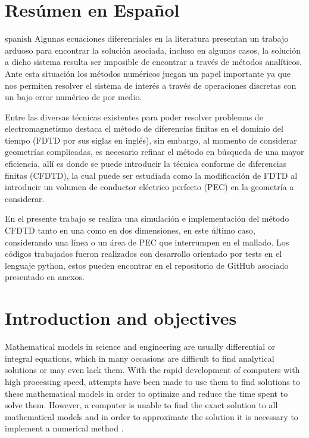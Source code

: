 \documentclass[12pt, oneside]{book}
\begin{document}
\chapter*{Resúmen en Español}

\begin{otherlanguage*}{spanish}
    \indent Algunas ecuaciones diferenciales en la literatura presentan un trabajo arduoso para encontrar la solución asociada, incluso en algunos casos, la solución a dicho sistema resulta ser imposible de encontrar a través de métodos analíticos. Ante esta situación los métodos numéricos juegan un papel importante ya que nos permiten resolver el sistema de interés a través de operaciones discretas con un bajo error numérico de por medio. 

    \indent Entre las diversas técnicas existentes para poder resolver problemas de electromagnetismo destaca el método de diferencias finitas en el dominio del tiempo (FDTD por sus siglas en inglés), sin embargo, al momento de considerar geometrías complicadas, es necesario refinar el método en búsqueda de una mayor eficiencia, allí es donde se puede introducir la técnica conforme de diferencias finitas (CFDTD), la cual puede ser estudiada como la modificación de FDTD al introducir un volumen de conductor eléctrico perfecto (PEC) en la geometría a considerar.

    \indent En el presente trabajo se realiza una simulación e implementación del método CFDTD tanto en una como en dos dimensiones, en este último caso, considerando una línea o un área de PEC que interrumpen en el mallado. Los códigos trabajados fueron realizados con desarrollo orientado por tests en el lenguaje python, estos pueden encontrar en el repositorio de GitHub asociado presentado en anexos.
\end{otherlanguage*}

\chapter{Introduction and objectives}

Mathematical models in science and engineering are usually differential or integral equations, which in many occasions are difficult to find analytical solutions or may even lack them. With the rapid development of computers with high processing speed, attempts have been made to use them to find solutions to these mathematical models in order to optimize and reduce the time spent to solve them. However, a computer is unable to find the exact solution to all mathematical models and in order to approximate the solution it is necessary to implement a numerical method \cite{Johnson1987}.
\end{document}
